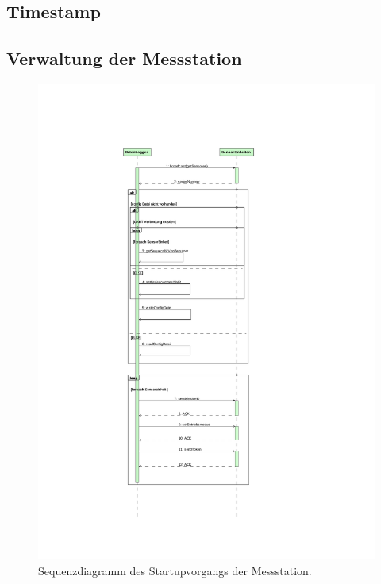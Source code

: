 \subsection{Timestamp}\label{subsec.sw_timestamp}

\subsection{Verwaltung der Messstation}\label{subsec.sw_busverwaltung}

\begin{figure}
	\centering
		\includegraphics[height=0.9\textheight]{images/magicdraw/StartUpSequenz.pdf}
	\caption{Sequenzdiagramm des Startupvorgangs der Messstation.}
	\label{fig.seq_startup}
\end{figure}

